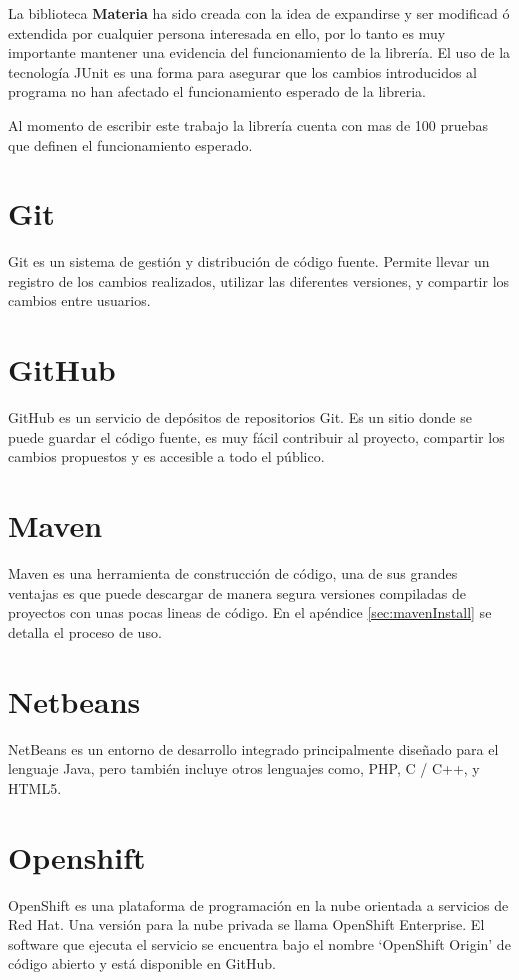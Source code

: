		 La biblioteca \textbf{Materia} ha sido creada con la idea de expandirse y ser modificad ó extendida por cualquier persona interesada en ello, por lo tanto es muy importante mantener una evidencia del funcionamiento de la librería. El uso de la tecnología JUnit es una forma para asegurar que los cambios introducidos al programa no han afectado el funcionamiento esperado de la libreria.

		Al momento de escribir este trabajo la librería cuenta con mas de 100 pruebas que definen el funcionamiento esperado.

	\section{Git}

		Git es un sistema de gestión y distribución de código fuente. Permite llevar un registro de los cambios realizados, utilizar las diferentes versiones, y compartir los cambios entre usuarios.

	\section{GitHub}

		GitHub es un servicio de depósitos de repositorios Git. Es un sitio donde se puede guardar el código fuente, es muy fácil contribuir al proyecto, compartir los cambios propuestos y es accesible a todo el público.

	\section{Maven}

		Maven es una herramienta de construcción de código, una de sus grandes ventajas es que puede descargar de manera segura versiones compiladas de proyectos con unas pocas lineas de código. En el apéndice \ref{sec:mavenInstall}  se detalla el proceso de uso.

	\section{Netbeans}
		NetBeans es un entorno de desarrollo integrado principalmente diseñado para el lenguaje Java, pero también incluye otros lenguajes como, PHP, C / C++, y HTML5. 

	\section{Openshift}
		OpenShift es una plataforma de programación en la nube orientada a servicios de Red Hat. Una versión para la nube privada se llama OpenShift Enterprise. El software que ejecuta el servicio se encuentra bajo el nombre `OpenShift Origin' de código abierto y está disponible en GitHub.

